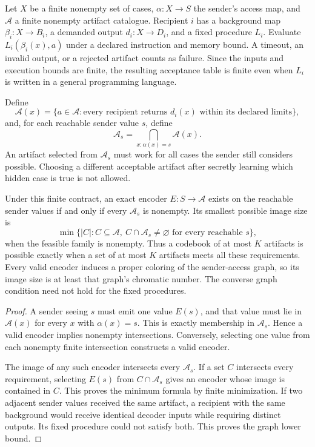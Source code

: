 Let $X$ be a finite nonempty set of cases, $\alpha:X\to S$ the sender's access map, and $\mathcal A$ a finite nonempty artifact catalogue. Recipient $i$ has a background map $\beta_i:X\to B_i$, a demanded output $d_i:X\to D_i$, and a fixed procedure $L_i$. Evaluate $L_i(\beta_i(x),a)$ under a declared instruction and memory bound. A timeout, an invalid output, or a rejected artifact counts as failure. Since the inputs and execution bounds are finite, the resulting acceptance table is finite even when $L_i$ is written in a general programming language.

Define
\[
\mathcal A(x)=\{a\in\mathcal A:\text{every recipient returns }d_i(x)
\text{ within its declared limits}\},
\]
and, for each reachable sender value $s$, define
\begin{equation}\label{MU:eq:decoder-intersection}
\mathcal A_s=\bigcap_{x:\alpha(x)=s}\mathcal A(x).
\end{equation}
An artifact selected from $\mathcal A_s$ must work for all cases the sender still considers possible. Choosing a different acceptable artifact after secretly learning which hidden case is true is not allowed.

\begin{MUtheorem}\label{MU:thm:fixed-decoder}
Under this finite contract, an exact encoder $E:S\to\mathcal A$ exists on the reachable sender values if and only if every $\mathcal A_s$ is nonempty. Its smallest possible image size is
\begin{equation}\label{MU:eq:decoder-cover}
\min\{|C|:C\subseteq\mathcal A,\ C\cap\mathcal A_s\ne\varnothing
\text{ for every reachable }s\},
\end{equation}
when the feasible family is nonempty. Thus a codebook of at most $K$ artifacts is possible exactly when a set of at most $K$ artifacts meets all these requirements. Every valid encoder induces a proper coloring of the sender-access graph, so its image size is at least that graph's chromatic number. The converse graph condition need not hold for the fixed procedures.
\end{MUtheorem}
\begin{proof}
A sender seeing $s$ must emit one value $E(s)$, and that value must lie in $\mathcal A(x)$ for every $x$ with $\alpha(x)=s$. This is exactly membership in $\mathcal A_s$. Hence a valid encoder implies nonempty intersections. Conversely, selecting one value from each nonempty finite intersection constructs a valid encoder.

The image of any such encoder intersects every $\mathcal A_s$. If a set $C$ intersects every requirement, selecting $E(s)$ from $C\cap\mathcal A_s$ gives an encoder whose image is contained in $C$. This proves the minimum formula by finite minimization. If two adjacent sender values received the same artifact, a recipient with the same background would receive identical decoder inputs while requiring distinct outputs. Its fixed procedure could not satisfy both. This proves the graph lower bound.
\end{proof}

